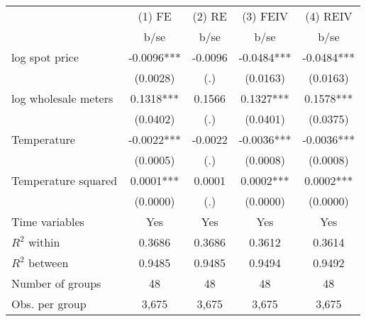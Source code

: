 \begin{tabular}{lcccc}\toprule
                    &      (1) FE   &      (2) RE   &    (3) FEIV   &    (4) REIV   \\
                    &        b/se   &        b/se   &        b/se   &        b/se   \\
\midrule
log spot price      &     -0.0096***&     -0.0096   &     -0.0484***&     -0.0484***\\
                    &    (0.0028)   &         (.)   &    (0.0163)   &    (0.0163)   \\
log wholesale meters&      0.1318***&      0.1566   &      0.1327***&      0.1578***\\
                    &    (0.0402)   &         (.)   &    (0.0401)   &    (0.0375)   \\
Temperature         &     -0.0022***&     -0.0022   &     -0.0036***&     -0.0036***\\
                    &    (0.0005)   &         (.)   &    (0.0008)   &    (0.0008)   \\
Temperature squared &      0.0001***&      0.0001   &      0.0002***&      0.0002***\\
                    &    (0.0000)   &         (.)   &    (0.0000)   &    (0.0000)   \\
Time variables      &         Yes   &         Yes   &         Yes   &         Yes   \\
\midrule
\(R^2\) within      &      0.3686   &      0.3686   &      0.3612   &      0.3614   \\
\(R^2\) between     &      0.9485   &      0.9485   &      0.9494   &      0.9492   \\
Number of groups    &          48   &          48   &          48   &          48   \\
Obs. per group      &       3,675   &       3,675   &       3,675   &       3,675   \\
\bottomrule\end{tabular}
